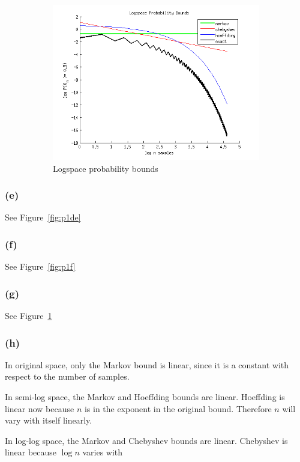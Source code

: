 \documentclass[letterpaper,10pt]{article} %
\begin{document}
\begin{figure}[h]
\begin{subfigure}[b]{\textwidth}
\includegraphics[width=\textwidth]{figs/p1g}
\caption{Logspace probability bounds}
\label{fig:p1g}
\end{subfigure}

\caption{}\label{fig:p1}
\end{figure}

\subsubsection*{(e)}

See Figure~\ref{fig:p1de}
\subsubsection*{(f)}
See Figure~\ref{fig:p1f}
\subsubsection*{(g)}
See Figure~\ref{fig:p1g}
\subsubsection*{(h)}
In original space, only the Markov bound is linear, since it is a constant with respect to the number of samples.

In semi-log space, the Markov and Hoeffding bounds are linear. Hoeffding is linear now because $n$ is in the exponent in the original bound. Therefore $n$ will vary with itself linearly.

In log-log space, the Markov and Chebyshev bounds are linear. Chebyshev is linear because $\log n$ varies with
\end{document}
